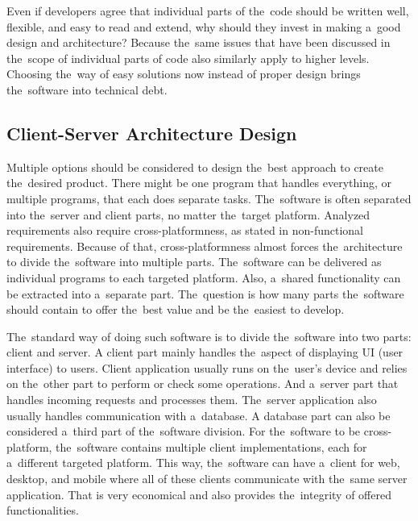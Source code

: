 Even if developers agree that individual parts of the~code should be written well, flexible, and easy to read and extend, why should they invest in making a~good design and architecture?
Because the~same issues that have been discussed in the~scope of individual parts of code also similarly apply to higher levels.
Choosing the~way of easy solutions now instead of proper design brings the~software into technical debt. 

\subsection{Client-Server Architecture Design}

Multiple options should be considered to design the~best approach to create the~desired product.
There might be one program that handles everything, or multiple programs, that each does separate tasks.
The~software is often separated into the~server and client parts, no matter the~target platform.
Analyzed requirements also require cross-platformness, as stated in non-functional requirements.
Because of that, cross-platformness almost forces the~architecture to divide the~software into multiple parts.
The~software can be delivered as individual programs to each targeted platform.
Also, a~shared functionality can be extracted into a~separate part.
The~question is how many parts the~software should contain to offer the~best value and be the~easiest to develop.

The~standard way of doing such software is to divide the~software into two parts: client and server.
A client part mainly handles the~aspect of displaying UI (user interface) to users.
Client application usually runs on the~user's device and relies on the~other part to perform or check some operations.
And a~server part that handles incoming requests and processes them.
The~server application also usually handles communication with a~database.
A database part can also be considered a~third part of the~software division.
For the~software to be cross-platform, the~software contains multiple client implementations, each for a~different targeted platform.
This way, the~software can have a~client for web, desktop, and mobile where all of these clients communicate with the~same server application.
That is very economical and also provides the~integrity of offered functionalities.

